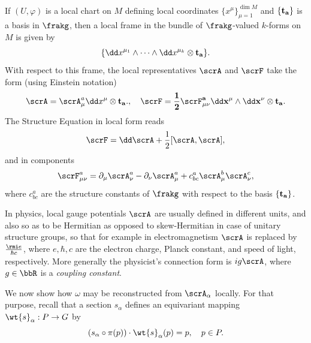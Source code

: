\begin{rem}\label{rem 1.3.10 RS2}
    If $(U,\varphi)$ is a local chart on $M$ defining local coordinates $\{x^\mu\}_{\mu=1}^{\dim M}$ and $\{\bf{t}_a\}$ is a basis in $\frakg$, then a local frame in the bundle of $\frakg$-valued $k$-forms on $M$ is given by
    \[\{\dd x^{\mu_1}\wedge\cdots\wedge \dd x^{\mu_k}\otimes\bf{t}_a\}.\]
    With respect to this frame, the local representatives $\scrA$ and $\scrF$ take the form (using Einstein notation)
    \[\scrA=\scrA_\mu^a \dd x^\mu \otimes\bf{t}_a.,\quad \scrF=\frac12 \scrF_{\mu\nu}^a \dd x^\mu\wedge\dd x^\nu\otimes \bf{t}_a.\]
    The Structure Equation in local form reads
    \[\scrF=\dd\scrA+ \frac12[\scrA,\scrA],\]
    and in components
    \[\scrF_{\mu\nu}^a=\partial_\mu \scrA_\nu^a-\partial_\nu \scrA_\mu^a+c^a_{bc}\scrA^b_\mu \scrA_\nu^c,\]
    where $c^a_{bc}$ are the structure constants of $\frakg$ with respect to the basis $\{\bf{t}_a\}$.

    In physics, local gauge potentials $\scrA$ are usually defined in different units, and also so as to be Hermitian as opposed to skew-Hermitian in case of unitary structure groups, so that for example in electromagnetism $\scrA$ is replaced by $\frac{\rmi e}{\hbar c}$, where $e,\hbar,c$ are the electron charge, Planck constant, and speed of light, respectively. More generally the physicist's connection form is $ig \scrA$, where $g\in\bbR$ is a \emph{coupling constant}.
\end{rem}


We now show how $\omega$ may be reconstructed from $\scrA_\alpha$ locally. For that purpose, recall that a section $s_\alpha$ defines an equivariant mapping $\wt{s}_\alpha:P\to G$ by
\[(s_\alpha\circ\pi(p))\cdot \wt{s}_\alpha(p)=p,\quad p\in P.\label{eq 1.3.13 RS2}\]

